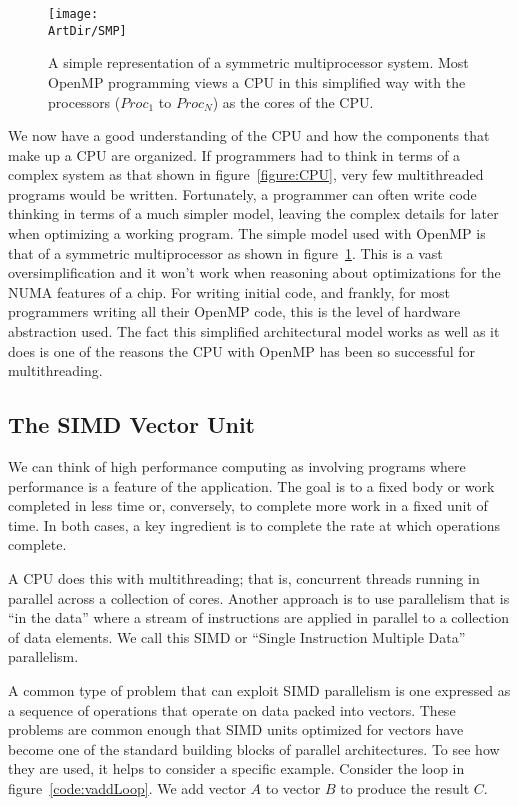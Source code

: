 \begin{figure}[t]
\centerline{\texttt{[image: \\ArtDir/SMP]}}
\caption{A simple representation of a symmetric multiprocessor system.  Most OpenMP programming views a CPU
in this simplified way with the processors ($Proc_1$ to $Proc_N$) as the cores of the CPU.}
\label{figure:SMP}
\end{figure}

We now have a good understanding of the CPU and how the components that make up a CPU are organized.  If programmers had
to think in terms of a complex system as that shown in figure~\ref{figure:CPU}, very few multithreaded programs would be written.   
Fortunately, a programmer can often write code thinking in terms of a much simpler model, leaving the complex details for later when
optimizing a working program. The simple model used with OpenMP is that of a symmetric multiprocessor as shown in figure~\ref{figure:SMP}.
This is a vast oversimplification and it won't work when reasoning about optimizations for the NUMA features of a chip.  For writing initial code, and 
frankly, for most programmers writing all their OpenMP code, this is the level of hardware abstraction used.  The fact this simplified architectural 
model works as well as it does is one of the reasons the CPU with OpenMP has been so successful for multithreading. 


\subsection{The SIMD Vector Unit}

We can think of high performance computing as involving programs where performance is a feature of the application.
The goal is to a fixed body or work completed in less time or, conversely, to complete more work in a fixed unit of time.
In both cases, a key ingredient is to complete the rate at which operations complete.   

A CPU does this with multithreading; that is, concurrent threads running in parallel across a collection of cores. 
Another approach is to use parallelism that is ``in the data'' where a stream of instructions are applied in
parallel to a collection of data elements.  We call this 
SIMD or ``Single Instruction Multiple Data'' parallelism.

A common type of problem that can exploit SIMD parallelism is one expressed as a sequence of
operations that operate on data packed into vectors.   These problems are common enough that SIMD units optimized
for vectors have become one of the standard building blocks of parallel architectures.  To see
how they are used, it helps to consider a specific example.  Consider the loop in figure~\ref{code:vaddLoop}.  
We add vector $A$ to vector $B$ to produce the result $C$.   


